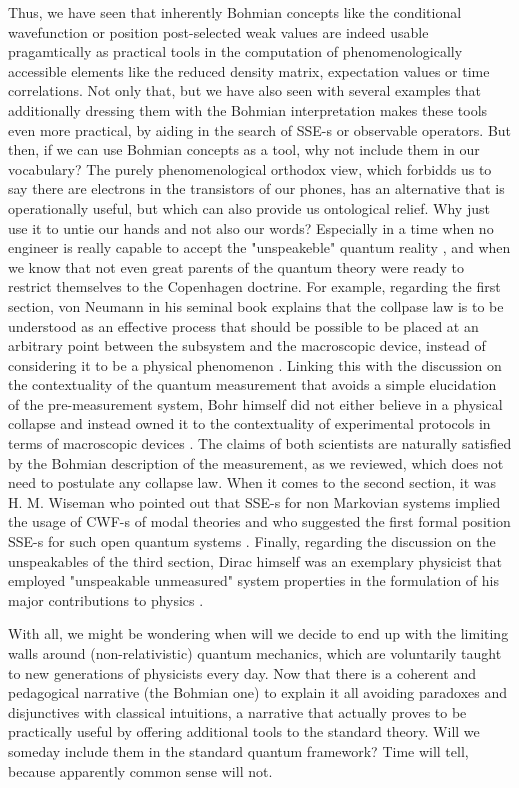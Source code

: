 \documentclass[11pt, a4paper]{article} %
\begin{document}
Thus, we have seen that inherently Bohmian concepts like the conditional wavefunction or position post-selected weak values are indeed usable pragamtically as practical tools in the computation of phenomenologically accessible elements like the reduced density matrix, expectation values or time correlations. Not only that, but we have also seen with several examples that additionally dressing them with the Bohmian interpretation makes these tools even more practical, by aiding in the search of SSE-s or observable operators. But then, if we can use Bohmian concepts as a tool, why not include them in our vocabulary? The purely phenomenological orthodox view, which forbidds us to say there are electrons in the transistors of our phones, has an alternative that is operationally useful, but which can also provide us ontological relief. Why just use it to untie our hands and not also our words? Especially in a time when no engineer is really capable to accept the "unspeakeble" quantum reality \cite{where}, and when we know that not even great parents of the quantum theory were ready to restrict themselves to the Copenhagen doctrine. For example, regarding the first section, von Neumann in his seminal book \cite{vonNeumann} explains that the collpase law is to be understood as an effective process that should be possible to be placed at an arbitrary point between the subsystem and the macroscopic device, instead of considering it to be a physical phenomenon \cite{NeumannNoCollapse}. Linking this with the discussion on the contextuality of the quantum measurement that avoids a simple elucidation of the pre-measurement system, Bohr himself did not either believe in a physical collapse and instead owned it to the contextuality of experimental protocols \cite{Dirac} in terms of macroscopic devices \cite{Bohr}. The claims of both scientists are naturally satisfied by the Bohmian description of the measurement, as we reviewed, which does not need to postulate any collapse law. When it comes to the second section, it was H. M. Wiseman who pointed out that SSE-s for non Markovian systems implied the usage of CWF-s of modal theories \cite{interpretSSE, NMisModal} and who suggested the first formal position SSE-s for such open quantum systems \cite{WisemanSSE}. Finally, regarding the discussion on the unspeakables of the third section, Dirac himself was an exemplary physicist that employed "unspeakable unmeasured" system properties in the formulation of his major contributions to physics \cite{Dirac}.

With all, we might be wondering when will we decide to end up with the limiting walls around (non-relativistic) quantum mechanics, which are voluntarily taught to new generations of physicists every day. Now that there is a coherent and pedagogical narrative (the Bohmian one) to explain it all avoiding paradoxes and disjunctives with classical intuitions, a narrative that actually proves to be practically useful by offering additional tools to the standard theory. Will we someday include them in the standard quantum framework? Time will tell, because apparently common sense will not.
\end{document}
